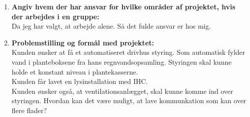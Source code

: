 \begin{enumerate}
    \item \textbf{Angiv hvem der har ansvar for hvilke områder af projektet, hvis der arbejdes i en
    gruppe:}\\ Da jeg har valgt, at arbejde alene. Så det fulde ansvar er hos mig.
    \item \textbf{Problemstilling og formål med projektet:} \\ 
    Kunden ønsker at få et automatiseret drivhus styring. Som
    automatisk fylder vand i planteboksene fra hans regnvandsopsamling.
    Styringen skal kunne holde et konstant niveau i plantekasserne. \\
    Kunden får lavet en lysinstallation med IHC. 
    \\
    Kunden ønsker også, at ventilationsanlægget, skal kunne komme ind over styringen.
    Hvordan kan det være muligt, at lave kommunkation som kan over flere flader?


\end{enumerate}
